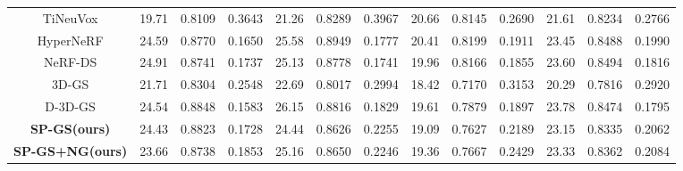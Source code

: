 \begin{table}
{\begin{tabular}{c|*{3}{c}|*{3}{c}|*{3}{c}|*{3}{c}}
        \midrule
TiNeuVox  & 19.71 & 0.8109 & 0.3643 & 21.26 & 0.8289 & 0.3967 & 20.66 & 0.8145 & 0.2690 & 21.61 & 0.8234 & 0.2766 \\
HyperNeRF & 24.59 & 0.8770 & 0.1650 & 25.58 & 0.8949 & 0.1777 & 20.41 & 0.8199 & 0.1911 & 23.45 & 0.8488 & 0.1990 \\
NeRF-DS   & 24.91 & 0.8741 & 0.1737 & 25.13 & 0.8778 & 0.1741 & 19.96 & 0.8166 & 0.1855 & 23.60 & 0.8494 & 0.1816 \\
3D-GS     & 21.71 & 0.8304 & 0.2548 & 22.69 & 0.8017 & 0.2994 & 18.42 & 0.7170 & 0.3153 & 20.29 & 0.7816 & 0.2920 \\
D-3D-GS   & 24.54 & 0.8848 & 0.1583 & 26.15 & 0.8816 & 0.1829 & 19.61 & 0.7879 & 0.1897 & 23.78 & 0.8474 & 0.1795  \\
\textbf{SP-GS(ours)}   & 24.43 & 0.8823 & 0.1728 & 24.44 & 0.8626 & 0.2255 & 19.09 & 0.7627 & 0.2189 & 23.15 & 0.8335 & 0.2062 \\
\textbf{SP-GS+NG(ours)}& 23.66 & 0.8738 & 0.1853 & 25.16 & 0.8650 & 0.2246 & 19.36 & 0.7667 & 0.2429 & 23.33 & 0.8362 & 0.2084 
\\
        \bottomrule
    \end{tabular}
    }
\end{table}


